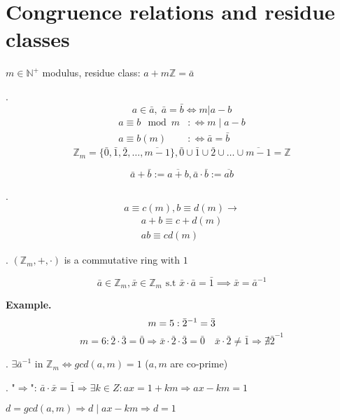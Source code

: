 \section{Congruence relations and residue classes}

\begin{definition}
$m \in \mathbb{N}^{+}$ modulus, 
residue class: $a+m \mathbb{Z} = \bar{a}$ 
\end{definition}

\Remark.
\[
  a\in \bar{a},\; \bar{a} = \bar{b} \iff m | a-b
\]
\begin{align*}
  a \equiv b \mod m & :\iff m \mid a-b \\
  a \equiv b (m)     & :\iff \bar{a} = \bar{b}
\end{align*}
\[
  \mathbb{Z}_m = \{ \bar{0},\bar{1},\bar{2}, \ldots, \overline{m-1}\} , 
  \bar{0} \cup \bar{1} \cup \bar{2} \cup  \ldots \cup \overline{m-1} = \mathbb{Z}
\]


\begin{definition}
\[
  \bar{a} + \bar{b} := \overline{a+b}, \bar{a} \cdot \bar{b} := \overline{ab}
\]
\end{definition}

\Remark.
\[
  a \equiv c(m), b \equiv d(m) \rightarrow 
\]
\begin{align*}
  a+b \equiv c+d(m) \\
  ab \equiv cd (m)
\end{align*}

\Theorem.
$(\mathbb{Z}_m, + , \cdot)$ is a commutative ring with $1$

\begin{definition}
\[
  \bar{a} \in \mathbb{Z}_m, \bar{x} \in \mathbb{Z}_m \text{ s.t }
  \bar{x} \cdot \bar{a} = \bar{1} \implies \bar{x} = \bar{a}^{-1}
\]
\end{definition}

\textbf{Example.}
\[
  m = 5: \bar{2}^{-1} = \bar{3} \\
\]
\[
  m = 6: \bar{2}\cdot\bar{3} = \bar{0} \Rightarrow \bar{x} \cdot \bar{2} \cdot \bar{3} = \bar{0} \quad \bar{x} \cdot \bar{2} \neq \bar{1} \Rightarrow \nexists \bar{2}^{-1}
\]

\Theorem.
$\exists \bar{a}^{-1} \text{ in } \mathbb{Z}_m \iff gcd(a,m) = 1$ ($a,m$ are co-prime)

\Proof.
"$\Rightarrow$": 
  $\bar{a}\cdot \bar{x} = \bar{1} \Rightarrow \exists k\in Z : 
  ax = 1 + km \Rightarrow ax - km = 1$

  $d = gcd(a,m) \Rightarrow d \mid ax - km \Rightarrow d = 1$

